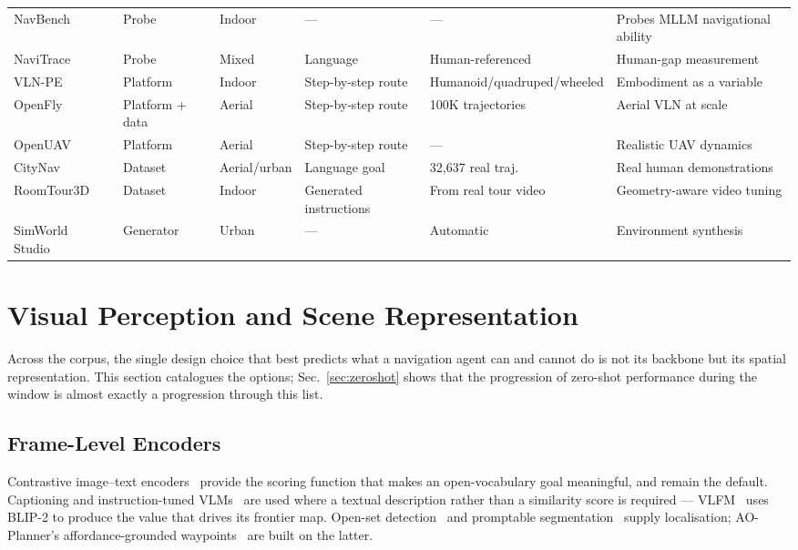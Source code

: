 \documentclass[journal]{IEEEtran}
\begin{document}
\begin{table}[!t]
\begin{tabular}{llllll}
    NavBench~\cite{qiao2025navbench}          & Probe     & Indoor & --- & --- & Probes MLLM navigational ability \\
    NaviTrace~\cite{windecker2025navitrace}   & Probe     & Mixed  & Language & Human-referenced & Human-gap measurement \\
    VLN-PE~\cite{wang2025rethinking}          & Platform  & Indoor & Step-by-step route & Humanoid/quadruped/wheeled & Embodiment as a variable \\
    \midrule
    OpenFly~\cite{gao2026openfly}             & Platform + data & Aerial & Step-by-step route & 100K trajectories & Aerial VLN at scale \\
    OpenUAV~\cite{wang2025towards}            & Platform  & Aerial & Step-by-step route & --- & Realistic UAV dynamics \\
    CityNav~\cite{lee2024citynav}             & Dataset   & Aerial/urban & Language goal & 32{,}637 real traj. & Real human demonstrations \\
    RoomTour3D~\cite{han2025roomtour}         & Dataset   & Indoor & Generated instructions & From real tour video & Geometry-aware video tuning \\
    SimWorld Studio~\cite{kang2026simworld}   & Generator & Urban & --- & Automatic & Environment synthesis \\
    \bottomrule
  \end{tabular}
\end{table}
\section{Visual Perception and Scene Representation}\label{sec:perception}
Across the corpus, the single design choice that best predicts what a
navigation agent can and cannot do is not its backbone but its spatial
representation. This section catalogues the options; Sec.~\ref{sec:zeroshot}
shows that the progression of zero-shot performance during the window is
almost exactly a progression through this list.

\subsection{Frame-Level Encoders}
Contrastive image--text encoders~\cite{radford2021learning} provide the
scoring function that makes an open-vocabulary goal meaningful, and remain
the default. Captioning and instruction-tuned
VLMs~\cite{li2023blip,liu2023visual} are used where a textual description
rather than a similarity score is required --- VLFM~\cite{yokoyama2024vlfm}
uses BLIP-2 to produce the value that drives its frontier map. Open-set
detection~\cite{liu2024grounding} and promptable
segmentation~\cite{kirillov2023segment} supply localisation; AO-Planner's
affordance-grounded waypoints~\cite{chen2024affordances} are built on the
latter.
\end{document}
